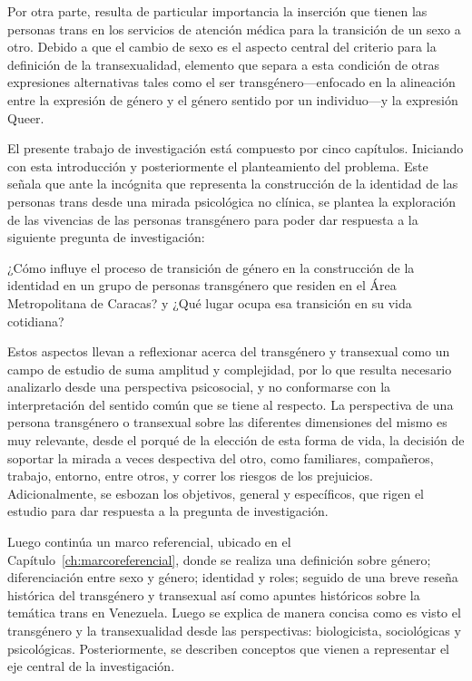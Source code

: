 Por otra parte, resulta de particular importancia la inserción que tienen las
personas trans en los servicios de atención médica para la transición de un sexo
a otro.
Debido a que el cambio de sexo es el aspecto central del criterio para la
definición de la transexualidad, elemento que separa a esta condición de otras
expresiones alternativas tales como el ser transgénero—enfocado en la
alineación entre la expresión de género y el género sentido por un individuo—y
la expresión Queer.

El presente trabajo de investigación está compuesto por cinco capítulos.
Iniciando con esta introducción y posteriormente el planteamiento del problema.
Este señala que ante la incógnita que representa la construcción de la identidad
de las personas trans desde una mirada psicológica no clínica, se plantea la
exploración de las vivencias de las personas transgénero para poder dar respuesta a la
siguiente pregunta de investigación:

\begin{slshape}
  \begin{adjustwidth}{2em}{2em}\label{preguntas}
¿Cómo influye el proceso de transición de género en la construcción de la
identidad en un grupo de personas transgénero que residen en el Área
Metropolitana de Caracas? y ¿Qué lugar ocupa esa transición en su vida cotidiana?
  \end{adjustwidth}
\end{slshape}

Estos aspectos llevan a reflexionar acerca del transgénero y transexual como un
campo de estudio de suma amplitud y complejidad, por lo que resulta necesario
analizarlo desde una perspectiva psicosocial, y no conformarse con la
interpretación del sentido común que se tiene al respecto.
La perspectiva de una persona transgénero o transexual sobre las diferentes
dimensiones del mismo es muy relevante, desde el porqué de la elección de esta
forma de vida, la decisión de soportar la mirada a veces despectiva del otro,
como familiares, compañeros, trabajo, entorno, entre otros, y correr los
riesgos de los prejuicios.
Adicionalmente, se esbozan los objetivos, general y específicos, que rigen el
estudio para dar respuesta a la pregunta de investigación.

Luego continúa un marco referencial, ubicado en el
Capítulo~\ref{ch:marcoreferencial}, donde se realiza una definición
sobre género;
diferenciación entre sexo y género;
identidad y roles;
seguido de una breve reseña histórica del transgénero y transexual así como
apuntes históricos sobre la temática trans en Venezuela.
Luego se explica de manera concisa como es visto el transgénero y la
transexualidad desde las perspectivas: biologicista, sociológicas y
psicológicas.
Posteriormente, se describen conceptos que vienen a representar el eje central
de la investigación.

